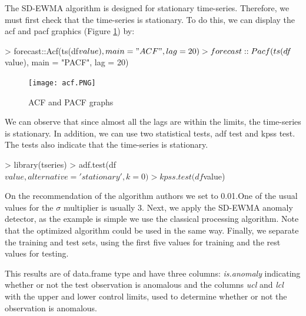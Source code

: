 \documentclass[a4paper]{article}
\begin{document}
The SD-EWMA algorithm is designed for stationary time-series. Therefore, we must first check that the time-series is stationary. To do this, we can display the acf and pacf graphics (Figure \ref{fig:acf}) by:

\begin{Schunk}
\begin{Sinput}
> forecast::Acf(ts(df$value), main = "ACF", lag = 20)
> forecast::Pacf(ts(df$value), main = "PACF", lag = 20)
\end{Sinput}
\end{Schunk}

\begin{figure}[htbp]
\centering
\texttt{[image: acf.PNG]}
\caption{ACF and PACF graphs}
\label{fig:acf}
\end{figure}

We can observe that since almost all the lags are within the limits, the time-series is stationary. In addition, we can use two statistical tests, adf test and kpss test. The tests also indicate that the time-series is stationary.

\begin{Schunk}
\begin{Sinput}
> library(tseries)
> adf.test(df$value, alternative = 'stationary', k = 0)
> kpss.test(df$value)
\end{Sinput}
\end{Schunk}

On the recommendation of the algorithm authors we set  to 0.01.One of the usual values for the $\sigma$ multiplier  is usually 3. Next, we apply the SD-EWMA anomaly detector, as the example is simple we use the classical processing algorithm. Note that the optimized algorithm could be used in the same way. Finally, we separate the training and test sets, using the first five values for training and the rest values for testing.

\begin{Schunk}
\end{Schunk}

This results are of data.frame type and have three columns: \emph{is.anomaly} indicating whether or not the test observation is anomalous and the columns \emph{ucl} and \emph{lcl} with the upper and lower control limits, used to determine whether or not the observation is anomalous.
\end{document}
